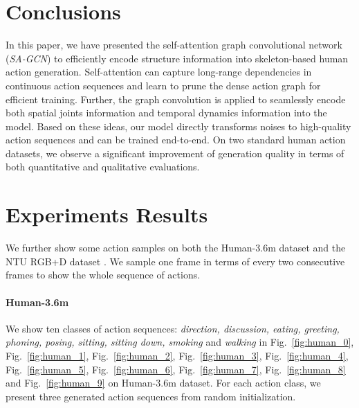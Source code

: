 \documentclass[runningheads]{llncs}
\begin{document}
\section{Conclusions}


In this paper, we have presented the self-attention graph convolutional network ({\it SA-GCN}) to efficiently encode structure information into skeleton-based human action generation. Self-attention can capture long-range dependencies in continuous action sequences and learn to prune the dense action graph for efficient training. Further, the graph convolution is applied to seamlessly encode both spatial joints information and temporal dynamics information into the model. Based on these ideas, our model directly transforms noises to high-quality action sequences and can be trained end-to-end. On two standard human action datasets, we observe a significant improvement of generation quality in terms of both quantitative and qualitative evaluations. 





\clearpage



\newpage
\appendix



\section{Experiments Results}

We further show some action samples on both the Human-3.6m dataset \cite{ionescu2013human3} and the NTU RGB+D dataset \cite{shahroudy2016ntu}. We sample one frame in terms of every two consecutive frames to show the whole sequence of actions.

\paragraph{Human-3.6m} 
We show ten classes of action sequences:
\textit{direction, discussion, eating, greeting, phoning, posing, sitting, sitting down, smoking} and \textit{walking} in Fig.~\ref{fig:human_0}, Fig.~\ref{fig:human_1}, Fig.~\ref{fig:human_2}, Fig.~\ref{fig:human_3}, Fig.~\ref{fig:human_4}, Fig.~\ref{fig:human_5}, Fig.~\ref{fig:human_6}, Fig.~\ref{fig:human_7}, Fig.~\ref{fig:human_8} and Fig.~\ref{fig:human_9} on Human-3.6m dataset. For each action class, we present three generated action sequences from random initialization.
\end{document}
